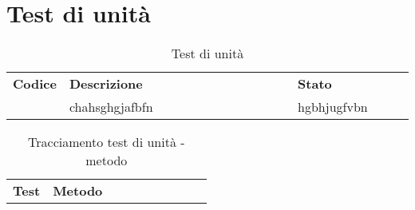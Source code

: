 \documentclass[PianoDiQualifica.tex]{subfiles}
\begin{document}
\chapter{Test di unità}

\begin{table}[H]
	\begin{center}
		\begin{tabu} to 
			\tableHeaderStyle			
			\textbf{Codice} & \textbf{Descrizione} & \textbf{Stato} \\
			1 & chahsghgjafbfn & hgbhjugfvbn\\

		\end{tabu}
		\caption{Test di unità}
		\vspace{-1em}
	\end{center}
\end{table}	

\begin{table}[H]
	\begin{center}
		\begin{tabu} to 
			\tableHeaderStyle			
			\textbf{Test} & \textbf{Metodo} \\
			
		\end{tabu}
		\caption{Tracciamento test di unità - metodo}
		\vspace{-1em}
	\end{center}
\end{table}	
\end{document}
